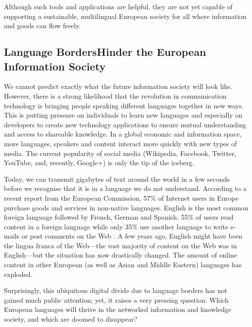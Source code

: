 \begin{multicols}{2}
Although such tools and applications are helpful, they are not yet capable of supporting a sustainable, multilingual European society for all where information and goods can flow freely.

\subsection[Language Borders Hinder the European Information Society]{Language Borders\newline Hinder the European Information Society}

    We cannot predict exactly what the future information society will look like. However, there is a strong likelihood that the revolution in communication technology is bringing people speaking different languages together in new ways. This is putting pressure on individuals to learn new languages and especially on developers to create new technology applications to ensure mutual understanding and access to shareable knowledge. In a global economic and information space, more languages, speakers and content interact more quickly with new types of media. The current popularity of social media (Wikipedia, Facebook, Twitter, YouTube, and, recently, Google+) is only the tip of the iceberg.


    Today, we can transmit gigabytes of text around the world in a few seconds before we recognise that it is in a language we do not understand. According to a recent report from the European Commission, 57\% of Internet users in Europe purchase goods and services in non-native languages. English is the most common foreign language followed by French, German and Spanish. 55\% of users read content in a foreign language while only 35\% use another language to write e-mails or post comments on the Web \cite{CAT-Nota1}. A few years ago, English might have been the lingua franca of the Web—the vast majority of content on the Web was in English—but the situation has now drastically changed. The amount of online content in other European (as well as Asian and Middle Eastern) languages has exploded.

    Surprisingly, this ubiquitous digital divide due to language borders has not gained much public attention; yet, it raises a very pressing question: Which European languages will thrive in the networked information and knowledge society, and which are doomed to disappear?


\end{multicols}
